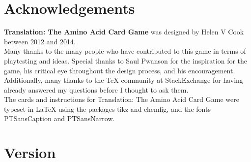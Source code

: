 \documentclass[a4paper,11pt,oneside]{memoir}
\begin{document}
%
%
%
%


\section*{Acknowledgements}

\textbf{Translation: The Amino Acid Card Game} was designed by Helen V Cook between 2012 and 2014.\\

Many thanks to the many people who have contributed to this game in terms of playtesting and ideas.
Special thanks to Saul Pwanson for the inspiration for the game, his critical eye throughout the design process, and his encouragement.\\

Additionally, many thanks to the \TeX{} community at StackExchange for having already answered my questions before I thought to ask them. \\

The cards and instructions for Translation: The Amino Acid Card Game were typeset in \textrm{\LaTeX} using the packages tikz and chemfig, and the fonts \widefont PTSansCaption \narrowfont and PTSansNarrow. 

\section*{Version}
\end{document}
